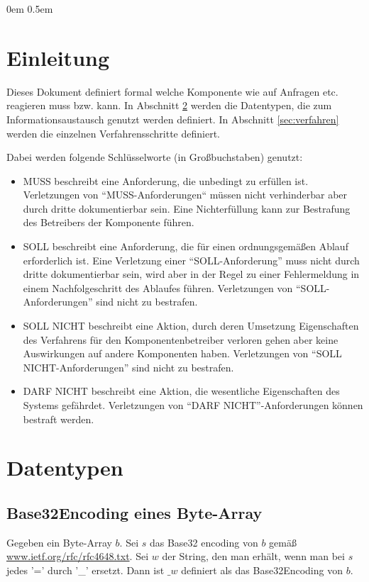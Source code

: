 \documentclass[a4paper,10pt]{article}
\title{\mytitle}
\author{AG Liquid Democracy, Ansprechpartner: \wiki{Benutzer:Wobble}{Wobble}, \wiki{Benutzer:Dunkelzahn}{Dunkelzahn}, \wiki{Benutzer:moonopool}{moonopool}}
\begin{document}
\parindent 0em
\parskip 0.5em


\maketitle

\tableofcontents

\section{Einleitung}
Dieses Dokument definiert formal welche Komponente wie auf Anfragen etc. reagieren muss bzw. kann. In Abschnitt \ref{sec:datentypen} werden die Datentypen, die zum Informationsaustausch genutzt werden definiert. In Abschnitt \ref{sec:verfahren} werden die einzelnen Verfahrensschritte definiert. 

Dabei werden folgende Schlüsselworte (in Großbuchstaben) genutzt:
\begin{itemize}
 \item MUSS beschreibt eine Anforderung, die unbedingt zu erfüllen ist. Verletzungen von ``MUSS-Anforderungen`` müssen nicht verhinderbar aber durch dritte dokumentierbar sein.
 Eine Nichterfüllung kann zur Bestrafung des Betreibers der Komponente führen.
 \item SOLL beschreibt eine Anforderung, die für einen ordnungsgemäßen Ablauf erforderlich ist. Eine Verletzung einer ``SOLL-Anforderung'' muss nicht durch dritte dokumentierbar sein, wird aber in der Regel zu einer Fehlermeldung in einem Nachfolgeschritt des Ablaufes führen. Verletzungen von ``SOLL-Anforderungen'' sind nicht zu bestrafen.
 \item SOLL NICHT beschreibt eine Aktion, durch deren Umsetzung Eigenschaften des Verfahrens für den Komponentenbetreiber verloren gehen aber keine Auswirkungen auf andere Komponenten haben. Verletzungen von ``SOLL NICHT-Anforderungen'' sind nicht zu bestrafen.
 \item DARF NICHT beschreibt eine Aktion, die wesentliche Eigenschaften des Systems gefährdet. Verletzungen von ``DARF NICHT''-Anforderungen können bestraft werden.
\end{itemize}


\section{Datentypen} \label{sec:datentypen}
\subsection{Base32Encoding eines Byte-Array}
Gegeben ein Byte-Array $b$. Sei $s$ das Base32 encoding von $b$ gemäß \href{https://www.ietf.org/rfc/rfc4648.txt}{www.ietf.org/rfc/rfc4648.txt}. Sei $w$ der String, den man erhält, wenn man bei $s$ jedes '=' durch '\_' ersetzt. 
Dann ist $\_w$ definiert als das Base32Encoding von $b$.
\end{document}
